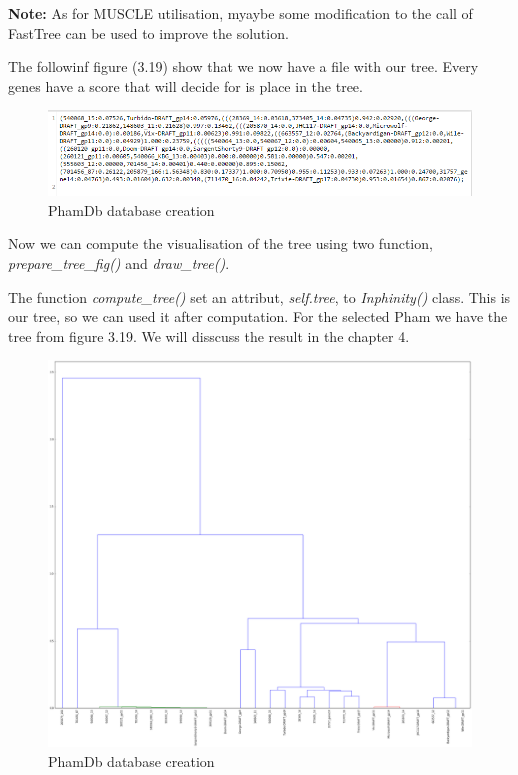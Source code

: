\documentclass[a4paper,11pt]{report}
\begin{document}
\textbf{Note:} As for MUSCLE utilisation, myaybe some modification to the call of FastTree can be used to improve the solution.

The followinf figure (3.19) show that we now have a file with our tree. Every genes have a score that will decide for is place in the tree.

\begin{figure}[H] 
	\begin{center}
		\includegraphics[scale=0.6]{img/tree}
		\caption{PhamDb database creation}
	\end{center}
\end{figure}

Now we can compute the visualisation of the tree using two function, \textit{prepare\_tree\_fig()} and \textit{draw\_tree()}.

The function \textit{compute\_tree()} set an attribut, \textit{self.tree}, to \textit{Inphinity()} class. This is our tree, so we can used it after computation. For the selected Pham we have the tree from figure 3.19. We will disscuss the result in the chapter 4.

\begin{figure}[H] 
	\begin{center}
		\includegraphics[scale=0.28]{img/tree_fig}
		\caption{PhamDb database creation}
	\end{center}
\end{figure}
\end{document}

